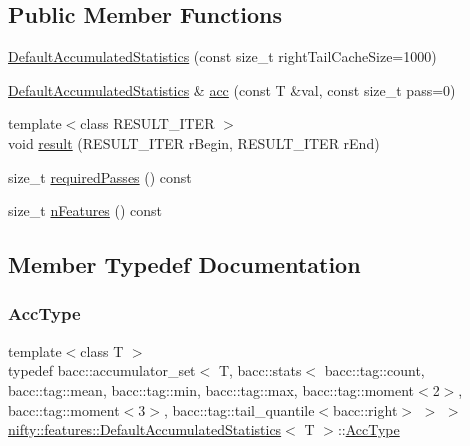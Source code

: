 \subsection*{Public Member Functions}
\begin{DoxyCompactItemize}
\item 
\hyperlink{classnifty_1_1features_1_1DefaultAccumulatedStatistics_a21c759b494f3d6476e414dd6607c05e8}{Default\+Accumulated\+Statistics} (const size\+\_\+t right\+Tail\+Cache\+Size=1000)
\item 
\hyperlink{classnifty_1_1features_1_1DefaultAccumulatedStatistics}{Default\+Accumulated\+Statistics} \& \hyperlink{classnifty_1_1features_1_1DefaultAccumulatedStatistics_a3cddf901950504afb3eacb8f2277c572}{acc} (const T \&val, const size\+\_\+t pass=0)
\item 
{\footnotesize template$<$class R\+E\+S\+U\+L\+T\+\_\+\+I\+T\+ER $>$ }\\void \hyperlink{classnifty_1_1features_1_1DefaultAccumulatedStatistics_a7adfcf8f044bb58815f95e925a350a4e}{result} (R\+E\+S\+U\+L\+T\+\_\+\+I\+T\+ER r\+Begin, R\+E\+S\+U\+L\+T\+\_\+\+I\+T\+ER r\+End)
\item 
size\+\_\+t \hyperlink{classnifty_1_1features_1_1DefaultAccumulatedStatistics_a98461855f3201e4ee425de5a4f067cd7}{required\+Passes} () const
\item 
size\+\_\+t \hyperlink{classnifty_1_1features_1_1DefaultAccumulatedStatistics_a17080663cdedd8b89d9f68500886482b}{n\+Features} () const
\end{DoxyCompactItemize}


\subsection{Member Typedef Documentation}
\mbox{\label{classnifty_1_1features_1_1DefaultAccumulatedStatistics_a1b5957732304d0ef906515d7229d8b7a}} 
\subsubsection{\texorpdfstring{Acc\+Type}{AccType}}
{\footnotesize\ttfamily template$<$class T $>$ \\
typedef bacc\+::accumulator\+\_\+set$<$ T, bacc\+::stats$<$ bacc\+::tag\+::count, bacc\+::tag\+::mean, bacc\+::tag\+::min, bacc\+::tag\+::max, bacc\+::tag\+::moment$<$2$>$, bacc\+::tag\+::moment$<$3$>$, bacc\+::tag\+::tail\+\_\+quantile$<$bacc\+::right$>$ $>$ $>$ \hyperlink{classnifty_1_1features_1_1DefaultAccumulatedStatistics}{nifty\+::features\+::\+Default\+Accumulated\+Statistics}$<$ T $>$\+::\hyperlink{classnifty_1_1features_1_1DefaultAccumulatedStatistics_a1b5957732304d0ef906515d7229d8b7a}{Acc\+Type}}

